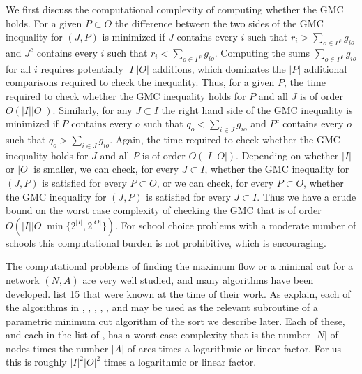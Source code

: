 \documentclass[12pt]{article}
\theoremstyle{definition}
\begin{document}
We first discuss the computational complexity of computing whether the GMC holds.  For a given $P \subset O$ the 
difference between the two sides of the GMC inequality for $(J,P)$ is minimized if $J$ contains every $i$ such that 
$r_i > \sum_{o \in P^c} g_{io}$ and $J^c$ contains every $i$ such that $r_i < \sum_{o \in P^c} g_{io}$.  Computing the sums $\sum_{o \in P^c} g_{io}$ for all $i$ requires potentially $|I||O|$ additions, which dominates the $|P|$ additional comparisons required to check the inequality.  Thus, for a given $P$, the time required to check whether the GMC inequality holds for $P$ and all $J$ is of order $O(|I||O|)$.
Similarly, for any $J \subset I$ the right hand side of the GMC inequality is minimized if $P$ contains every $o$ such that $q_o < \sum_{i \in J} g_{io}$ and $P^c$ contains every $o$ such that $q_o > \sum_{i \in J} g_{io}$. Again,  the time required to check whether the GMC inequality holds for $J$ and all $P$ is of order $O(|I||O|)$.   Depending on whether $|I|$ or $|O|$ is smaller, we can check, for every $J \subset I$, whether the GMC inequality for $(J,P)$ is satisfied for every $P \subset O$, or we can check, for every $P \subset O$, whether the GMC inequality for $(J,P)$ is satisfied for every $J \subset I$.
Thus we have a crude bound on the worst case complexity of checking the GMC that is of order $O(|I||O|\min\{2^{|I|}, 2^{|O|}\})$.  For school choice problems with a moderate number of schools this computational burden is not prohibitive, which is encouraging.

The computational problems of finding the maximum flow or a minimal cut  for a network $(N,A)$ are very well studied, and many algorithms have been developed.  \cite{GoTa88} list 15 that were known at the time of their work. As \cite{GrMcQuTa12} explain, each of the algorithms in 
\cite{GoTa88}, \cite{GuTa94}, \cite{Hoc08}, \cite{karzanov74smd}, 
\cite{KiRaTa94}, and \cite{Tar84} may be used as the relevant subroutine of a parametric minimum cut algorithm of the sort we describe later.  Each of these, and each in the list of \cite{GoTa88}, has a worst case complexity that is the number $|N|$ of nodes times the number $|A|$ of arcs times a logarithmic or linear factor.  For us this is roughly $|I|^2|O|^2$ times a logarithmic or linear factor.  
\end{document}
